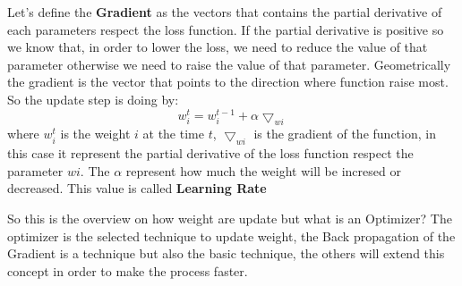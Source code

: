 Let's define the \textbf{Gradient} as the vectors that contains the partial derivative of each parameters respect the loss function. If the partial derivative is positive so we know that, in order to lower the loss, we need to reduce the value of that parameter otherwise we need to raise the value of that parameter. Geometrically the gradient is the vector that points to the direction where function raise most. 
So the update step is doing by:
\begin{equation}
w_i^t = w_i^{t-1} + \alpha\bigtriangledown_{wi} 
\end{equation}
where $w_i^t$ is the weight $i$ at the time $t$, $\bigtriangledown_{wi} $ is the gradient of the function, in this case it represent the partial derivative of the loss function respect the parameter $wi$. The $\alpha$ represent how much the weight will be incresed or decreased. This value is called \textbf{Learning Rate}



So this is the overview on how weight are update but what is an Optimizer?
The optimizer is the selected technique to update weight, the Back propagation of the Gradient is a technique but also the basic technique, the others will extend this concept in order to make the process faster.

\subsection{}
